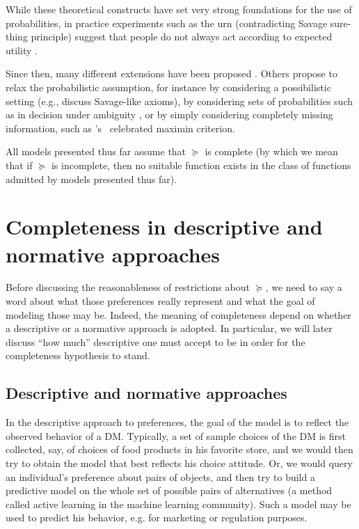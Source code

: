 \documentclass[french, english]{llncs}
\begin{document}
While these theoretical constructs have set very strong foundations for the use of probabilities, in practice experiments such as the \citet{ellsberg_risk_1961} urn (contradicting Savage sure-thing principle) suggest that people do not always act according to expected utility \citep{maccrimmon_utility_1979}. 
	
Since then, many different extensions have been proposed \citep{wakker_prospect_2010, quiggin_generalized_2012}. Others propose to relax the probabilistic assumption, for instance by considering a possibilistic setting  (e.g., \citet{dubois_qualitative_2003} discuss Savage-like axioms), by considering sets of probabilities such as in decision under ambiguity \citep{gajdos_attitude_2008}, or by simply considering completely missing information, such as \citeauthor{wald_statistical_1992}'s~\citeyearpar{wald_statistical_1992} celebrated maximin criterion. 
	
All models presented thus far assume that $\succeq$ is complete (by which we mean that if $\succeq$ is incomplete, then no suitable function exists in the class of functions admitted by models presented thus far).
	
\section{Completeness in descriptive and normative approaches}\label{sec:nordesc}
Before discussing the reasonableness of restrictions about $\succeq$, we need to say a word about what those preferences really represent and what the goal of modeling those may be. Indeed, the meaning of completeness depend on whether a descriptive or a normative approach is adopted. In particular, we will later discuss “how much” descriptive one must accept to be in order for the completeness hypothesis to stand.
	
\subsection{Descriptive and normative approaches}
In the descriptive approach to preferences, the goal of the model is to reflect the observed behavior of a \ac{DM}. Typically, a set of sample choices of the \ac{DM} is first collected, say, of choices of food products in his favorite store, and we would then try to obtain the model that best reflects his choice attitude. Or, we would query an individual’s preference about pairs of objects, and then try to build a predictive model on the whole set of possible pairs of alternatives (a method called active learning in the machine learning community). Such a model may be used to predict his behavior, e.g. for marketing or regulation purposes. 
\end{document}
